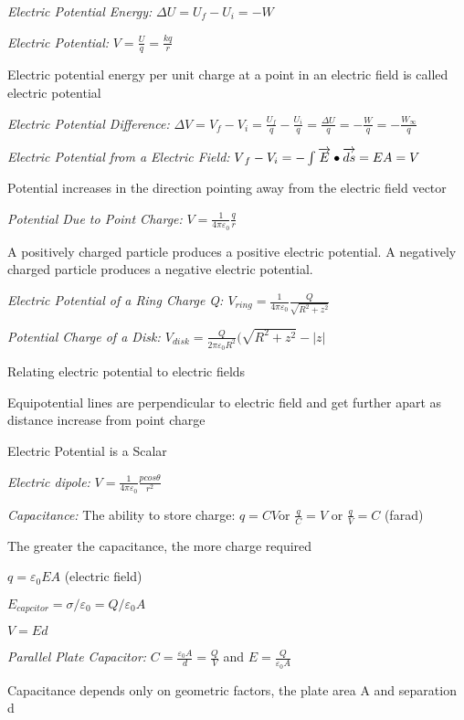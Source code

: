\documentclass[english]{article}
\begin{document}
\emph{Electric Potential Energy:} $\varDelta U=U_{f}-U_{i}=-W$

\emph{Electric Potential: }$V=\frac{U}{q}=\frac{kq}{r}$

Electric potential energy per unit charge at a point in an electric
field is called electric potential

\emph{Electric Potential Difference:} $\varDelta V=V_{f}-V_{i}=\frac{U_{f}}{q}-\frac{U_{i}}{q}=\frac{\varDelta U}{q}=-\frac{W}{q}=-\frac{W_{\infty}}{q}$

\emph{Electric Potential from a Electric Field:} $V{}_{f}-V_{i}=-\intop\overrightarrow{E}\bullet\overrightarrow{ds}=EA=V$

Potential increases in the direction pointing away from the electric
field vector

\emph{Potential Due to Point Charge:} $V=\frac{1}{4\pi\varepsilon_{0}}\frac{q}{r}$

A positively charged particle produces a positive electric potential.
A negatively charged particle produces a negative electric potential.

\emph{Electric Potential of a Ring Charge Q: $V_{ring}=\frac{1}{4\pi\varepsilon_{0}}\frac{Q}{\sqrt{R^{2}+z^{2}}}$}

\emph{Potential Charge of a Disk: $V_{disk}=\frac{Q}{2\pi\varepsilon_{0}R^{2}}(\sqrt{R^{2}+z^{2}}-|z|$}

Relating electric potential to electric fields

Equipotential lines are perpendicular to electric field and get further
apart as distance increase from point charge

Electric Potential is a Scalar

\emph{Electric dipole:} $V=\frac{1}{4\pi\varepsilon_{0}}\frac{pcos\theta}{r^{2}}$

\emph{Capacitance:} The ability to store charge: $q=CV$or $\frac{q}{C}=V$
or $\frac{q}{V}=C$ (farad)

The greater the capacitance, the more charge required

$q=\varepsilon_{0}EA$ (electric field)

$E_{capcitor}=\sigma/\varepsilon_{0}=Q/\varepsilon_{0}A$

$V=Ed$

\emph{Parallel Plate Capacitor:} $C=\frac{\varepsilon_{0}A}{d}=\frac{Q}{V}$
and $E=\frac{Q}{\varepsilon_{0}A}$

Capacitance depends only on geometric factors, the plate area A and
separation d
\end{document}
